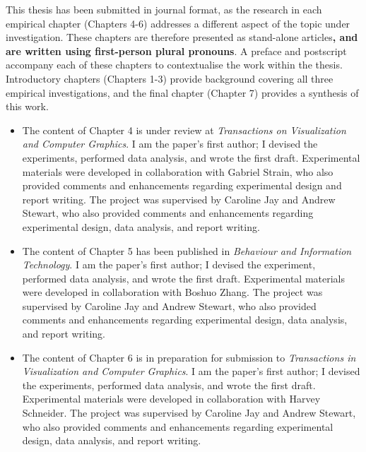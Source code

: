 This thesis has been submitted in journal format, as the research in each empirical chapter (Chapters 4-6) addresses a different aspect of the topic under investigation. These chapters are therefore presented as stand-alone articles\textbf{, and are written using first-person plural pronouns}. A preface and postscript accompany each of these chapters to contextualise the work within the thesis. Introductory chapters (Chapters 1-3) provide background covering all three empirical investigations, and the final chapter (Chapter 7) provides a synthesis of this work.

\begin{itemize} 
\item The content of Chapter 4 is under review at \textit{Transactions on Visualization and Computer Graphics}. I am the paper’s first author; I devised the experiments, performed data analysis, and wrote the first draft. Experimental materials were developed in collaboration with Gabriel Strain, who also provided comments and enhancements regarding experimental design and report writing. The project was supervised by Caroline Jay and Andrew Stewart, who also provided comments and enhancements regarding experimental design, data analysis, and report writing.
\item The content of Chapter 5 has been published in \textit{Behaviour and Information Technology}. I am the paper’s first author; I devised the experiment, performed data analysis, and wrote the first draft. Experimental materials were developed in collaboration with Boshuo Zhang. The project was supervised by Caroline Jay and Andrew Stewart, who also provided comments and enhancements regarding experimental design, data analysis, and report writing.
\item The content of Chapter 6 is in preparation for submission to \textit{Transactions in Visualization and Computer Graphics}. I am the paper’s first author; I devised the experiments, performed data analysis, and wrote the first draft. Experimental materials were developed in collaboration with Harvey Schneider. The project was supervised by Caroline Jay and Andrew Stewart, who also provided comments and enhancements regarding experimental design, data analysis, and report writing.\\
\end{itemize} 